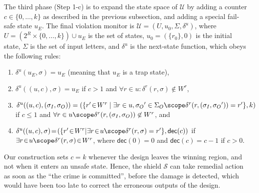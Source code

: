 \documentclass{llncs}
\newcommand{\shield}{\mathcal{S}}
\newcommand{\dinletter}{{\sigma_I}}
\newcommand{\doutalph}{\Sigma_O}
\newcommand{\doutletter}{{\sigma_O}}
\newcommand{\dalph}{\Sigma}
\newcommand{\dletter}{\sigma}
\newcommand{\kin}{\!\in\!}
\begin{document}
The third phase (Step 1-c) is to expand the state space of $\mathcal{U}$ 
by adding a counter $c\in\{0,\ldots,k\}$ as described in the previous 
subsection, and adding a special fail-safe state $u_E$.   
The final violation monitor is $\mathcal{U} = (U, u_0, \dalph, 
\delta^u)$, where $U = (2^{R} \times \{0, \ldots, k\}) \cup {u_E}$ is 
the set of states, $u_0 = (\{r_0\}, 0)$ is the initial state, $\dalph$ 
is the set of input letters, and $\delta^u$ is the next-state function, 
which obeys the following rules:
\begin{enumerate}
\item $\delta^u(u_E, \dletter) = u_E$ 
      (meaning that $u_E$ is a trap state), \label{eq:subset_s}
\item $\delta^u((u,c), \dletter) = u_E$ if $c>1$ and
      $\forall r \in u: \delta^r(r,\dletter) \not\in W^r$, 
      \label{eq:subset_a}
\item $\delta^u((u,c), (\dinletter, \doutletter)) = 
      (\{r' \kin W^r \mid \exists r\in u, \doutletter' \in \doutalph 
         \scope \delta^r(r,(\dinletter,\doutletter')) = r'\}, k)$\\
if $c\leq 1$ and $\forall r \in u \scope 
    \delta^r(r,(\dinletter, \doutletter)) \not\in W^r$, 
and
\label{eq:subset_m}
\item $\delta^u((u,c), \dletter) \!=\! 
      (\{r'\kin W^r |\exists r\kin u \scope\delta^r(r,\dletter) = r'\}, 
       \textsf{dec}(c))$
if $\exists r \kin u \scope \delta^r(r,\dletter) \kin W^r$,
where $\textsf{dec}(0) = 0$ and $\textsf{dec}(c) = c-1$ if $c>0$.  
\label{eq:subset_n}
\end{enumerate}
Our construction sets $c=k$ whenever the design leaves the winning 
region, and not when it enters an unsafe state.  Hence, the shield 
$\shield$ can take remedial action as soon as the ``the crime is 
committed'', before the damage is detected, which would have been too 
late to correct the erroneous outputs of the design. 
\end{document}
